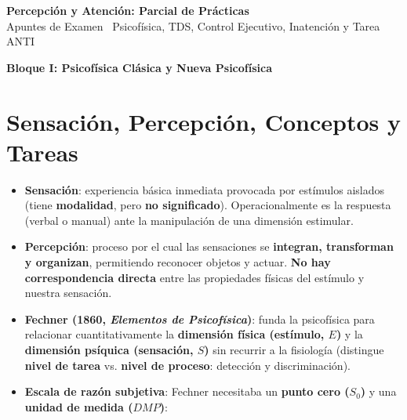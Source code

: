 \documentclass[11pt,a4paper]{article}
\newcommand{\bloque}[1]{%
  \vspace{0.6em}
  \begin{tcolorbox}[colback=Primary,colframe=Primary,arc=3pt,left=12pt,right=12pt,top=8pt,bottom=8pt,boxrule=0pt,after skip=8pt]
    {\Large\bfseries\color{white} #1}
  \end{tcolorbox}
}
\begin{document}
\begin{tcolorbox}[
  colback=Primary,
  colframe=Primary,
  arc=4pt,
  left=14pt, right=14pt, top=12pt, bottom=12pt,
  boxrule=0pt,
  after skip=10pt
]
  {\color{white}\Huge\bfseries Percepción y Atención: Parcial de Prácticas}\\[0.35em]
  {\color{SoftBg}\large Apuntes de Examen \textbullet\ Psicofísica, TDS, Control Ejecutivo, Inatención y Tarea ANTI}
\end{tcolorbox}

\bloque{Bloque I: Psicofísica Clásica y Nueva Psicofísica}
\setcounter{section}{0}

\section{Sensación, Percepción, Conceptos y Tareas}

\begin{itemize}
  \item \textbf{Sensación}: experiencia básica inmediata provocada por estímulos aislados (tiene \textbf{modalidad}, pero \textbf{no significado}). Operacionalmente es la respuesta (verbal o manual) ante la manipulación de una dimensión estimular.
  \item \textbf{Percepción}: proceso por el cual las sensaciones se \textbf{integran, transforman y organizan}, permitiendo reconocer objetos y actuar. \textbf{No hay correspondencia directa} entre las propiedades físicas del estímulo y nuestra sensación.
  \item \textbf{Fechner (1860, \textit{Elementos de Psicofísica})}: funda la psicofísica para relacionar cuantitativamente la \textbf{dimensión física (estímulo, $E$)} y la \textbf{dimensión psíquica (sensación, $S$)} sin recurrir a la fisiología (distingue \textbf{nivel de tarea} vs. \textbf{nivel de proceso}: detección y discriminación).
  \item \textbf{Escala de razón subjetiva}: Fechner necesitaba un \textbf{punto cero ($S_0$)} y una \textbf{unidad de medida ($DMP$)}:
\end{itemize}
\end{document}
